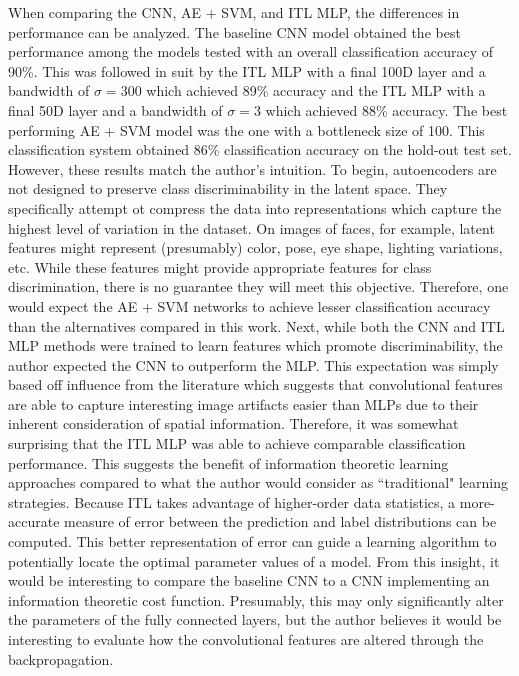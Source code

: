 \documentclass[conference]{IEEEtran}
\begin{document}
When comparing the CNN, AE + SVM, and ITL MLP, the differences in performance can be analyzed.  The baseline CNN model obtained the best performance among the models tested with an overall classification accuracy of 90\%.  This was followed in suit by the ITL MLP with a final 100D layer and a bandwidth of $\sigma=300$ which achieved 89\% accuracy and the ITL MLP with a final 50D layer and a bandwidth of $\sigma=3$ which achieved 88\% accuracy.  The best performing AE + SVM model was the one with a bottleneck size of 100.  This classification system obtained 86\% classification accuracy on the hold-out test set.  However, these results match the author's intuition.  To begin, autoencoders are not designed to preserve class discriminability in the latent space.  They specifically attempt ot compress the data into  representations which capture the highest level of variation in the dataset.  On images of faces, for example, latent features might represent (presumably) color, pose, eye shape, lighting variations, etc.  While these features might provide appropriate features for class discrimination, there is no guarantee they will meet this objective.  Therefore, one would expect the AE + SVM networks to achieve lesser classification accuracy than the alternatives compared in this work.  Next, while both the CNN and ITL MLP methods were trained to  learn features which promote discriminability, the author expected the CNN to outperform the MLP.  This expectation was simply based off influence from the literature which suggests that convolutional features are able to capture interesting image artifacts easier than MLPs due to their inherent consideration of spatial information.  Therefore, it was somewhat surprising that the ITL MLP was able to achieve comparable classification performance.  This suggests the benefit of information theoretic learning approaches compared to what the author would consider as ``traditional" learning strategies.  Because ITL takes advantage of higher-order data statistics, a more-accurate measure of error between the  prediction and label distributions can be computed.  This better representation of error can guide a learning algorithm to potentially locate  the optimal  parameter values of a model.  From this insight, it would be interesting to compare the baseline CNN to a CNN implementing an information theoretic cost function.  Presumably, this may only significantly alter  the parameters of the fully connected layers, but the author believes it would be interesting to evaluate how the convolutional features are altered through the backpropagation.
\end{document}
